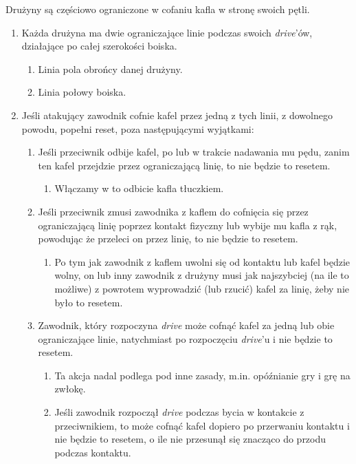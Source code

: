\documentclass[11pt,a4paper]{article}
\renewcommand{\subsubsection}[1]{
  \oldsubsubsection{#1}%
  \label{\thesubsubsection}
}
\begin{document}
\subsubsection{Resetowanie kafla}
Drużyny są częściowo ograniczone w cofaniu kafla w stronę swoich pętli.
\begin{enumerate}
  \item Każda drużyna ma dwie ograniczające linie podczas swoich \emph{drive}'ów, działające po całej szerokości boiska.
  \begin{enumerate}
    \item Linia pola obrońcy danej drużyny.
    \item Linia połowy boiska.
  \end{enumerate}
  \item Jeśli atakujący zawodnik cofnie kafel przez jedną z tych linii, z dowolnego powodu, popełni reset, poza następującymi wyjątkami:
  \begin{enumerate}
    \item Jeśli przeciwnik odbije kafel, po lub w trakcie nadawania mu pędu, zanim ten kafel przejdzie przez ograniczającą linię, to nie będzie to resetem.
    \begin{enumerate}
      \item Włączamy w to odbicie kafla tłuczkiem.
    \end{enumerate}
    \item Jeśli przeciwnik zmusi zawodnika z kaflem do cofnięcia się przez ograniczającą linię poprzez kontakt fizyczny lub wybije mu kafla z rąk, powodując że przeleci on przez linię, to nie będzie to resetem.
    \begin{enumerate}
      \item Po tym jak zawodnik z kaflem uwolni się od kontaktu lub kafel będzie wolny, on lub inny zawodnik z drużyny musi jak najszybciej (na ile to możliwe) z powrotem wyprowadzić (lub rzucić) kafel za linię, żeby nie było to resetem.
    \end{enumerate}
    \item Zawodnik, który rozpoczyna \emph{drive} może cofnąć kafel za jedną lub obie ograniczające linie, natychmiast po rozpoczęciu \emph{drive}'u i nie będzie to resetem.
    \begin{enumerate}
      \item Ta akcja nadal podlega pod inne zasady, m.in. opóźnianie gry i grę na zwłokę.
      \item Jeśli zawodnik rozpoczął \emph{drive} podczas bycia w kontakcie z przeciwnikiem, to może cofnąć kafel dopiero po przerwaniu kontaktu i nie będzie to resetem, o ile nie przesunął się znacząco do przodu podczas kontaktu.

\end{enumerate}
\end{enumerate}
\end{enumerate}
\end{document}
